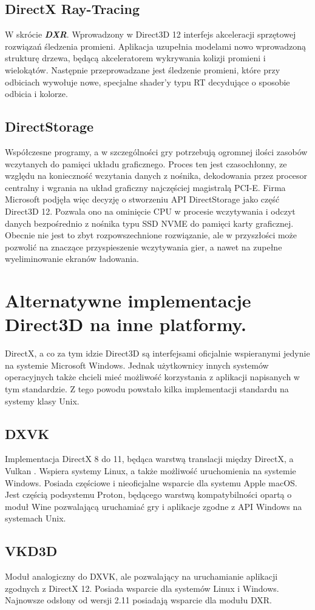 \subsection{DirectX Ray-Tracing}
W skrócie \emph{\textbf{DXR}}. Wprowadzony w Direct3D 12 interfejs
akceleracji sprzętowej rozwiązań śledzenia promieni. Aplikacja uzupełnia
modelami nowo wprowadzoną strukturę drzewa, będącą akceleratorem
wykrywania kolizji promieni i wielokątów. Następnie przeprowadzane jest
śledzenie promieni, które przy odbiciach wywołuje nowe, specjalne
shader'y typu RT decydujące o sposobie odbicia i kolorze.

\subsection{DirectStorage}
Współczesne programy, a w szczególności gry potrzebują ogromnej ilości
zasobów wczytanych do pamięci układu graficznego. Proces ten jest
czasochłonny, ze względu na konieczność wczytania danych z nośnika,
dekodowania przez procesor centralny i wgrania na układ graficzny
najczęściej magistralą PCI-E. Firma Microsoft podjęła więc decyzję o stworzeniu API DirectStorage jako
część Direct3D 12. Pozwala ono na ominięcie CPU w procesie wczytywania i
odczyt danych bezpośrednio z nośnika typu SSD NVME do pamięci karty
graficznej. Obecnie nie jest to zbyt rozpowszechnione rozwiązanie, ale w
przyszłości może pozwolić na znaczące przyspieszenie wczytywania gier, a
nawet na zupełne wyeliminowanie ekranów ładowania.

\section{Alternatywne implementacje Direct3D na inne platformy.} %

DirectX, a co za tym idzie Direct3D są interfejsami oficjalnie
wspieranymi jedynie na systemie Microsoft Windows. Jednak użytkownicy
innych systemów operacyjnych także chcieli mieć możliwość korzystania z
aplikacji napisanych w tym standardzie. Z tego powodu powstało kilka
implementacji standardu na systemy klasy Unix.

\subsection{DXVK}
Implementacja DirectX 8 do 11, będąca warstwą translacji między DirectX,
a Vulkan \cite{github:dxvk:2024}. Wspiera systemy Linux, a także możliwość uruchomienia
na systemie Windows. Posiada częściowe i nieoficjalne wsparcie dla
systemu Apple macOS. Jest częścią podsystemu Proton, będącego warstwą
kompatybilności opartą o moduł Wine pozwalającą uruchamiać gry i
aplikacje zgodne z API Windows na systemach Unix.

\subsection{VKD3D}
Moduł analogiczny do DXVK, ale pozwalający na uruchamianie aplikacji
zgodnych z DirectX 12. Posiada wsparcie dla systemów Linux i Windows. Najnowsze odsłony od wersji 2.11 posiadają wsparcie dla modułu DXR.